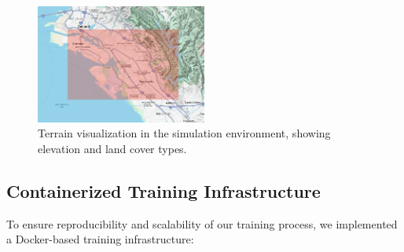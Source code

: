 \documentclass[conference]{IEEEtran}
\begin{document}
\begin{figure}[h!]
\centering
\includegraphics[width=0.5\textwidth]{terrain.png}
\caption{Terrain visualization in the simulation environment, showing elevation and land cover types.}
\end{figure}

\subsection{Containerized Training Infrastructure}

To ensure reproducibility and scalability of our training process, we implemented a Docker-based training infrastructure:
\end{document}
